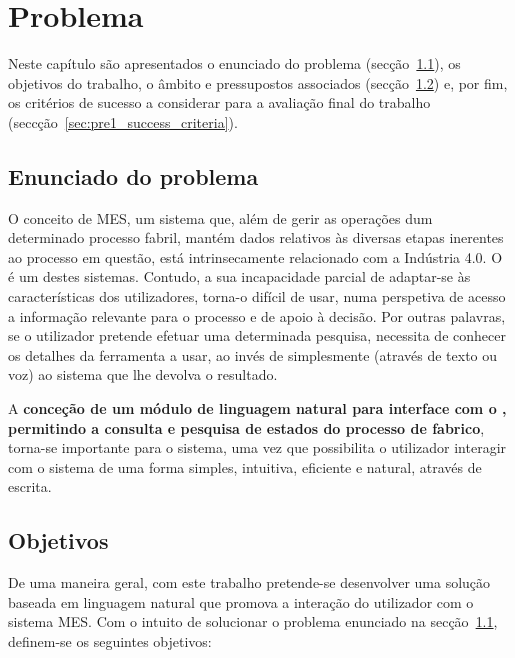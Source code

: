 \chapter{Problema}
\label{chap:pre1}

Neste capítulo são apresentados o enunciado do problema (secção~\ref{sec:pre1_problem}), os objetivos do trabalho, o âmbito e pressupostos associados (secção~\ref{sec:pre1_objectives}) e, por fim, os critérios de sucesso a considerar para a avaliação final do trabalho (seccção~\ref{sec:pre1_success_criteria}).

\section{Enunciado do problema}
\label{sec:pre1_problem}

O conceito de \gls{MES}, um sistema que, além de gerir as operações dum determinado processo fabril, mantém dados relativos às diversas etapas inerentes ao processo em questão, está intrinsecamente relacionado com a Indústria 4.0. O {\productname} é um destes sistemas. Contudo, a sua incapacidade parcial de adaptar-se às características dos utilizadores, torna-o difícil de usar, numa perspetiva de acesso a informação relevante para o processo e de apoio à decisão. Por outras palavras, se o utilizador pretende efetuar uma determinada pesquisa, necessita de conhecer os detalhes da ferramenta a usar, ao invés de simplesmente  (através de texto ou voz) ao sistema que lhe devolva o resultado.

A \textbf{conceção de um módulo de linguagem natural para interface com o {\productname}, permitindo a consulta e pesquisa de estados do processo de fabrico}, torna-se importante para o sistema, uma vez que possibilita o utilizador interagir com o sistema de uma forma simples, intuitiva, eficiente e natural, através de escrita.

\section{Objetivos}
\label{sec:pre1_objectives}
De uma maneira geral, com este trabalho pretende-se desenvolver uma solução baseada em linguagem natural que promova a interação do utilizador com o sistema \gls{MES}. Com o intuito de solucionar o problema enunciado na secção~\ref{sec:pre1_problem}, definem-se os seguintes objetivos:

